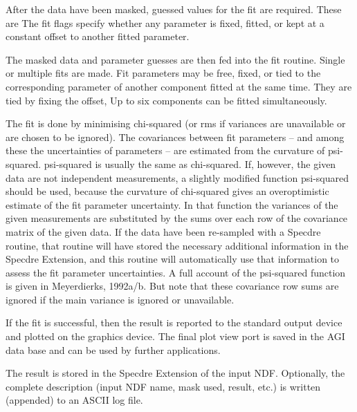 {{      After the data have been masked, guessed values for the fit are
      required. These are
      The fit flags specify whether any parameter is fixed, fitted, or
      kept at a constant offset to another fitted parameter.

      The masked data and parameter guesses are then fed into the fit
      routine. Single or multiple fits are made. Fit parameters may be
      free, fixed, or tied to the corresponding parameter of another
      component fitted at the same time. They are tied by fixing the
      offset, Up to six components can be fitted simultaneously.

      The fit is done by minimising chi-squared (or rms if variances are
      unavailable or are chosen to be ignored). The covariances between
      fit parameters -- and among these the uncertainties of parameters --
      are estimated from the curvature of psi-squared. psi-squared is
      usually the same as chi-squared. If, however, the given data are
      not independent measurements, a slightly modified function
      psi-squared should be used, because the curvature of chi-squared
      gives an overoptimistic estimate of the fit parameter uncertainty.
      In that function the variances of the given measurements are
      substituted by the sums over each row of the covariance matrix of
      the given data. If the data have been re-sampled with a Specdre
      routine, that routine will have stored the necessary additional
      information in the Specdre Extension, and this routine will
      automatically use that information to assess the fit parameter
      uncertainties. A full account of the psi-squared function is given
      in Meyerdierks, 1992a/b. But note that these covariance row sums
      are ignored if the main variance is ignored or unavailable.

      If the fit is successful, then the result is reported to
      the standard output device and plotted on the graphics device. The
      final plot view port is saved in the AGI data base and can be used
      by further applications.

      The result is stored in the Specdre Extension of the input NDF.
      Optionally, the complete description (input NDF name, mask used,
      result, etc.) is written (appended) to an ASCII log file.

}}
